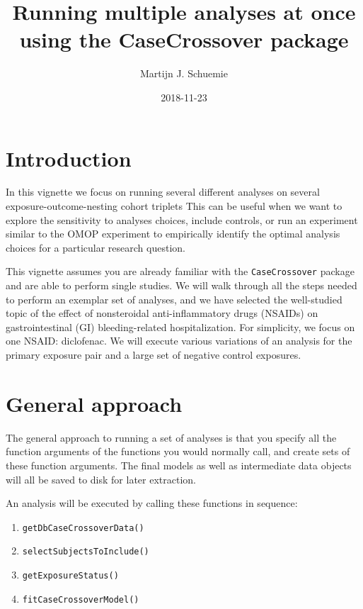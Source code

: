 \documentclass[]{article}
\title{Running multiple analyses at once using the CaseCrossover package}
\author{Martijn J. Schuemie}
\date{2018-11-23}
\providecommand{\tightlist}{%
  \setlength{\itemsep}{0pt}\setlength{\parskip}{0pt}}
\begin{document}
\maketitle

{
\setcounter{tocdepth}{2}
\tableofcontents
}
\hypertarget{introduction}{%
\section{Introduction}\label{introduction}}

In this vignette we focus on running several different analyses on
several exposure-outcome-nesting cohort triplets This can be useful when
we want to explore the sensitivity to analyses choices, include
controls, or run an experiment similar to the OMOP experiment to
empirically identify the optimal analysis choices for a particular
research question.

This vignette assumes you are already familiar with the
\texttt{CaseCrossover} package and are able to perform single studies.
We will walk through all the steps needed to perform an exemplar set of
analyses, and we have selected the well-studied topic of the effect of
nonsteroidal anti-inflammatory drugs (NSAIDs) on gastrointestinal (GI)
bleeding-related hospitalization. For simplicity, we focus on one NSAID:
diclofenac. We will execute various variations of an analysis for the
primary exposure pair and a large set of negative control exposures.

\hypertarget{general-approach}{%
\section{General approach}\label{general-approach}}

The general approach to running a set of analyses is that you specify
all the function arguments of the functions you would normally call, and
create sets of these function arguments. The final models as well as
intermediate data objects will all be saved to disk for later
extraction.

An analysis will be executed by calling these functions in sequence:

\begin{enumerate}
\def\labelenumi{\arabic{enumi}.}
\tightlist
\item
  \texttt{getDbCaseCrossoverData()}
\item
  \texttt{selectSubjectsToInclude()}
\item
  \texttt{getExposureStatus()}
\item
  \texttt{fitCaseCrossoverModel()}
\end{enumerate}
\end{document}
